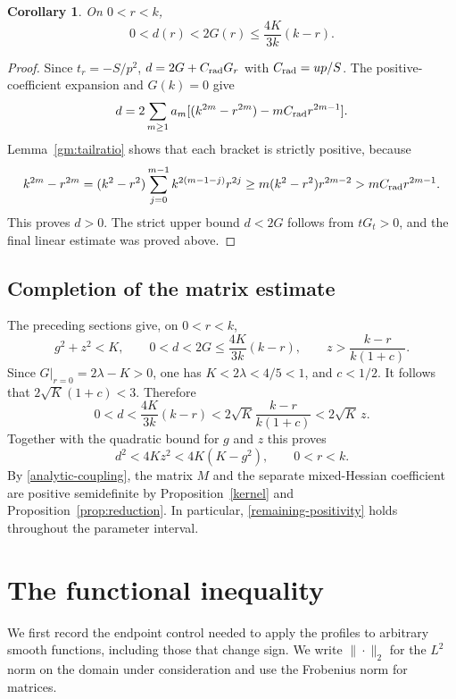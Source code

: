 \documentclass[11pt]{article}
\newtheorem{corollary}[theorem]{Corollary}
\theoremstyle{remark}
\begin{document}
\begin{corollary}
On $0<r<k$,
\[
 0<d(r)<2G(r)\le\frac{4K}{3k}(k-r).
\]
\end{corollary}
\begin{proof}
Since $t_r=-S/p^2$, $d=2G+C_{\rm rad} G_r$ with $C_{\rm rad}=up/S$.
The positive-coefficient expansion and $G(k)=0$ give
\[
 d=2\sum_{m\ge1}a_m
       [(k^{2m}-r^{2m})-mC_{\rm rad} r^{2m-1}].
\]
Lemma~\ref{gm:tailratio} shows that each bracket is strictly positive,
because
\[
 k^{2m}-r^{2m}
 =(k^2-r^2)\sum_{j=0}^{m-1}k^{2(m-1-j)}r^{2j}
 \ge m(k^2-r^2)r^{2m-2}>mC_{\rm rad} r^{2m-1}.
\]
This proves $d>0$. The strict upper bound $d<2G$ follows from
$tG_t>0$, and the final linear estimate was proved above.
\end{proof}

\subsection{Completion of the matrix estimate}
The preceding sections give, on $0<r<k$,
\[
 g^2+z^2<K,\qquad
 0<d<2G\le\frac{4K}{3k}(k-r),\qquad
 z>\frac{k-r}{k(1+c)}.
\]
Since $G|_{r=0}=2\lambda-K>0$, one has $K<2\lambda<4/5<1$, and $c<1/2$.
It follows that $2\sqrt K(1+c)<3$. Therefore
\[
 0<d<\frac{4K}{3k}(k-r)
 <2\sqrt K\frac{k-r}{k(1+c)}<2\sqrt K\,z.
\]
Together with the quadratic bound for $g$ and $z$ this proves
\begin{equation}\label{analytic-coupling}
 \boxed{\quad d^2<4Kz^2<4K(K-g^2),\qquad0<r<k.\quad}
\end{equation}
By \eqref{analytic-coupling}, the matrix $M$ and the separate mixed-Hessian
coefficient are positive semidefinite by Proposition~\ref{kernel}
and Proposition~\ref{prop:reduction}. In particular,
\eqref{remaining-positivity} holds throughout the parameter interval. 
\section{The functional inequality}\label{sec:functional}
We first record the endpoint control needed to apply the profiles to
arbitrary smooth functions, including those that change sign. We write
$\|\cdot\|_2$ for the $L^2$ norm on the domain under consideration
and use the Frobenius norm for matrices.
\end{document}
